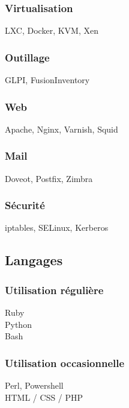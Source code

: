 \documentclass[a4paper]{tsacha-resume}
\begin{document}
\begin{minipage}[t]{0.3\textwidth}
  \subsubsection{Virtualisation}
  LXC, Docker, KVM, Xen

  \subsubsection{Outillage}
  GLPI, FusionInventory

  \subsubsection{Web}
  Apache, Nginx, Varnish, Squid

  \subsubsection{Mail}
  Doveot, Postfix, Zimbra

  \subsubsection{Sécurité}
  iptables, SELinux, Kerberos


  \subsection{Langages}
  \subsubsection{Utilisation régulière}
  Ruby\\
  Python\\
  Bash

  \subsubsection{Utilisation occasionnelle}
  Perl, Powershell\\
  HTML / CSS / PHP

\end{minipage}
\hfill
\end{document}
